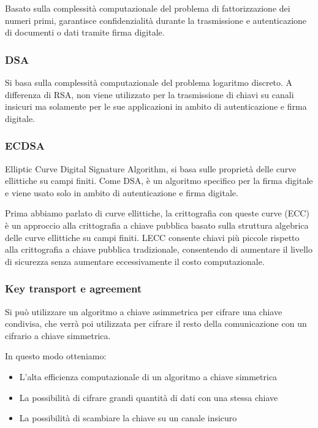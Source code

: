 \documentclass[
]{article}
\providecommand{\tightlist}{%
  \setlength{\itemsep}{0pt}\setlength{\parskip}{0pt}}
\begin{document}
{Basato sulla complessità computazionale del problema di fattorizzazione
dei numeri primi, garantisce confidenzialità durante la trasmissione e
autenticazione di documenti o dati tramite firma digitale.}

\subsubsection{\texorpdfstring{{DSA}}{DSA}}\label{h.1k930vatga2}

{Si basa sulla complessità computazionale del problema logaritmo
discreto. A differenza di RSA, non viene utilizzato per la trasmissione
di chiavi su canali insicuri ma solamente per le sue applicazioni in
ambito di autenticazione e firma digitale. }

\subsubsection{\texorpdfstring{{ECDSA}}{ECDSA}}\label{h.bjr8ot96b60t}

{Elliptic Curve Digital Signature Algorithm, si basa sulle proprietà
delle curve ellittiche su campi finiti. Come DSA, è un algoritmo
specifico per la firma digitale e viene usato solo in ambito di
autenticazione e firma digitale.}

{}

{Prima abbiamo parlato di curve ellittiche, la crittografia con queste
curve (ECC) è un approccio alla crittografia a chiave pubblica basato
sulla struttura algebrica delle curve ellittiche su campi finiti.
L\textquotesingle ECC consente chiavi più piccole rispetto alla
crittografia a chiave pubblica tradizionale, consentendo di aumentare il
livello di sicurezza senza aumentare eccessivamente il costo
computazionale.}

\subsubsection{\texorpdfstring{{Key transport e
agreement}}{Key transport e agreement}}\label{h.46a9zjfw506c}

{Si può utilizzare un algoritmo a chiave asimmetrica per cifrare una
chiave condivisa, che verrà poi utilizzata per cifrare il resto della
comunicazione con un cifrario a chiave simmetrica. }

{In questo modo otteniamo: }

\begin{itemize}
\tightlist
\item
  {L'alta efficienza computazionale di un algoritmo a chiave simmetrica}
\item
  {La possibilità di cifrare grandi quantità di dati con una stessa
  chiave }
\item
  {La possibilità di scambiare la chiave su un canale insicuro}
\end{itemize}
\end{document}
